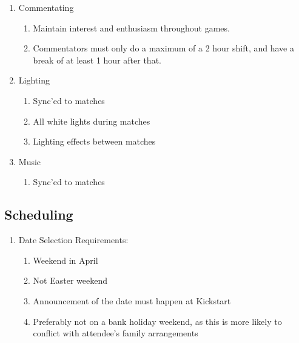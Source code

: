 \begin{enumerate}
\begin{enumerate}
  \item Commentating
    \begin{enumerate}
    \item Maintain interest and enthusiasm throughout games.
    \item Commentators must only do a maximum of a 2 hour shift, and have a break of at least 1 hour after that.
    \end{enumerate}


  \item Lighting
    \begin{enumerate}
    \item Sync'ed to matches
    \item All white lights during matches
    \item Lighting effects between matches
    \end{enumerate}

  \item Music
    \begin{enumerate}
    \item Sync'ed to matches
    \end{enumerate}

  \end{enumerate}
\end{enumerate}

\subsection{Scheduling}
\begin{enumerate}
\item Date Selection Requirements:
  \begin{enumerate}
  \item Weekend in April
  \item Not Easter weekend
  \item Announcement of the date must happen at Kickstart
  \item Preferably not on a bank holiday weekend, as this is more likely to conflict with attendee's family arrangements
  \end{enumerate}
\end{enumerate}
  
